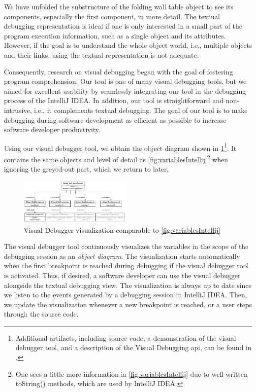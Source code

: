 \documentclass[conference]{IEEEtran}
\newcommand{\intellij}{IntelliJ IDEA}
\begin{document}
We have unfolded the substructure of the \textsf{folding wall table} object to see its components, especially the first component, in more detail.
The textual debugging representation is ideal if one is only interested in a small part of the program execution information, such as a single object and its attributes.
However, if the goal is to understand the whole object world, i.e., multiple objects and their links, using the textual representation is not adequate.

Consequently, research on visual debugging began with the goal of fostering program comprehension.
Our tool is one of many visual debugging tools, but we aimed for excellent usability by seamlessly integrating our tool in the debugging process of the \intellij{}.
In addition, our tool is straightforward and non-intrusive, i.e., it complements textual debugging.
The goal of our tool is to make debugging during software development as efficient as possible to increase software developer productivity.

Using our visual debugger tool, we obtain the object diagram shown in \cref{fig:visualDebuggerVariables}\footnote{\label{footnote:artifacts} Additional artifacts, including source code, a demonstration of the visual debugger tool, and a description of the Visual Debugging \acrshort*{api}, can be found in \cite{ArtifactsICSME2022}.}.
It contains the same objects and level of detail as \cref{fig:variablesIntellij}\footnote{One sees a little more information in \cref{fig:variablesIntellij} due to well-written \textsf{toString()} methods, which are used by \intellij{}.} when ignoring the greyed-out part, which we return to later.

\begin{figure}[h]
    \centering
    \includegraphics[width=0.489\textwidth]{images/VD-partsList-objects.pdf}
    \caption{Visual Debugger visualization comparable to \cref{fig:variablesIntellij}}
    \label{fig:visualDebuggerVariables}
\end{figure}

The visual debugger tool continuously visualizes the variables in the scope of the debugging session as an \textit{object diagram}.
The visualization starts automatically when the first breakpoint is reached during debugging if the visual debugger tool is activated.
Thus, if desired, a software developer can use the visual debugger alongside the textual debugging view.
The visualization is always up to date since we listen to the events generated by a debugging session in \intellij{}.
Then, we update the visualization whenever a new breakpoint is reached, or a user steps through the source code.
\end{document}
